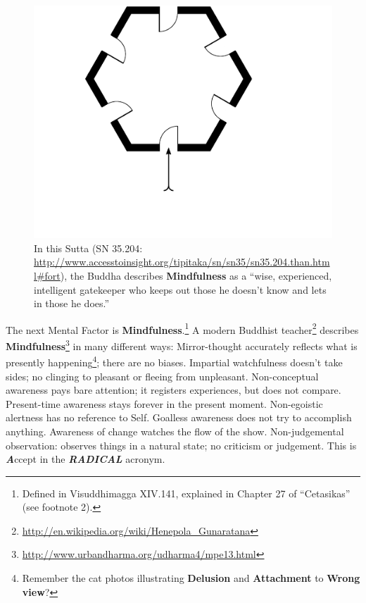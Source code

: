 \begin{figure}[h]
\centering
\includegraphics[width=1.0\linewidth]{./Diagrams/Fortress}
\caption{In this Sutta (SN 35.204: \url{http://www.accesstoinsight.org/tipitaka/sn/sn35/sn35.204.than.html\#fort}), the Buddha describes \textbf{Mindfulness} as a “wise, experienced, intelligent gatekeeper who keeps out those he doesn’t know and lets in those he does.”}
\label{fig:Fortress}
\end{figure}

The next Mental Factor is \textbf{Mindfulness}.\footnote{Defined in Visuddhimagga XIV.141, explained in Chapter 27 of “Cetasikas” (see footnote 2).} A modern Buddhist teacher\footnote{\url{http://en.wikipedia.org/wiki/Henepola_Gunaratana}} describes \textbf{Mindfulness}\footnote{\url{http://www.urbandharma.org/udharma4/mpe13.html}} in many different ways: Mirror-thought accurately reflects what is presently happening\footnote{Remember the cat photos illustrating \textbf{Delusion} and \textbf{Attachment} to \textbf{Wrong view}?}; there are no biases. Impartial watchfulness doesn’t take sides; no clinging to pleasant or fleeing from unpleasant. Non-conceptual awareness pays bare attention; it registers experiences, but does not compare. Present-time awareness stays forever in the present moment. Non-egoistic alertness has no reference to Self. Goalless awareness does not try to accomplish anything. Awareness of change watches the flow of the show. Non-judgemental observation: observes things in a natural state; no criticism or judgement. This is \textbf{\textit{A}}ccept in the \textbf{\textit{RADICAL}} acronym.

